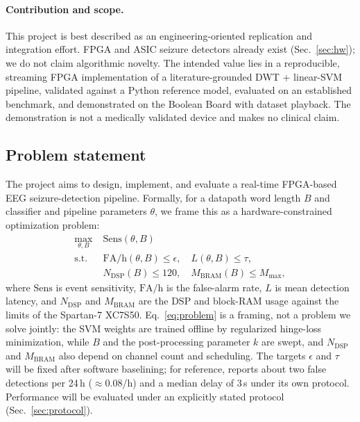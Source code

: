 \documentclass[10pt,twocolumn,letterpaper]{article}
\begin{document}
\paragraph{Contribution and scope.} This project is best described as an
engineering-oriented replication and integration effort. FPGA and ASIC
seizure detectors already exist (Sec.~\ref{sec:hw}); we do not claim
algorithmic novelty. The intended value lies in a reproducible,
streaming FPGA implementation of a literature-grounded DWT +
linear-SVM pipeline, validated against a Python reference model,
evaluated on an established benchmark, and demonstrated on the Boolean
Board with dataset playback. The demonstration is not a medically
validated device and makes no clinical claim.

\subsection{Problem statement}
\label{sec:problem}

The project aims to design, implement, and evaluate a real-time
FPGA-based EEG seizure-detection pipeline. Formally, for a datapath word
length $B$ and classifier and pipeline parameters $\theta$, we frame this
as a hardware-constrained optimization problem:
\begin{equation}
\begin{aligned}
\max_{\theta,B}\;& \mathrm{Sens}(\theta,B)\\
\text{s.t.}\;& \mathrm{FA/h}(\theta,B)\le\epsilon,\quad L(\theta,B)\le\tau,\\
& N_{\mathrm{DSP}}(B)\le 120,\quad M_{\mathrm{BRAM}}(B)\le M_{\max},
\end{aligned}
\label{eq:problem}
\end{equation}
where $\mathrm{Sens}$ is event sensitivity, $\mathrm{FA/h}$ is the
false-alarm rate, $L$ is mean detection latency, and $N_{\mathrm{DSP}}$
and $M_{\mathrm{BRAM}}$ are the DSP and block-RAM usage against the
limits of the Spartan-7 XC7S50. Eq.~\eqref{eq:problem} is a framing, not
a problem we solve jointly: the SVM weights are trained offline by
regularized hinge-loss minimization, while $B$ and the post-processing
parameter $k$ are swept, and $N_{\mathrm{DSP}}$ and $M_{\mathrm{BRAM}}$
also depend on channel count and scheduling. The targets $\epsilon$ and
$\tau$ will be fixed after software baselining; for reference,
\cite{shoeb2010icml} reports about two false detections per 24\,h
($\approx0.08$/h) and a median delay of 3\,s under its own protocol.
Performance will be evaluated under an explicitly stated protocol
(Sec.~\ref{sec:protocol}).
\end{document}
